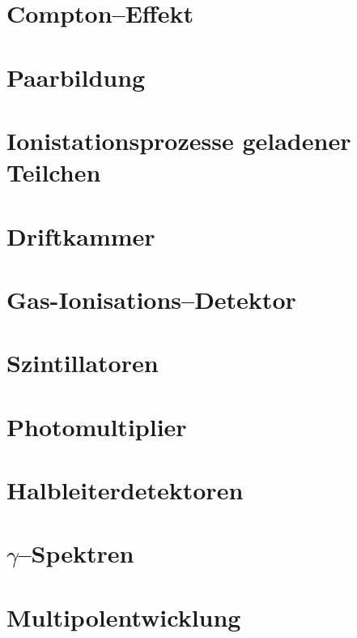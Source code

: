 \documentclass[BCOR=5mm,DIV=calc,listof=totoc,headings=big]{scrartcl}
\begin{document}
\section{Compton--Effekt}
\label{sec:compton-effekt}

\section{Paarbildung}
\label{sec:paarbildung}

\section{Ionistationsprozesse geladener Teilchen}
\label{sec:ionist-gelad-teilch}

\section{Driftkammer}
\label{sec:driftkammer}

\section{Gas-Ionisations--Detektor}
\label{sec:gas-ionis-detekt}

\section{Szintillatoren}
\label{sec:szintillatoren}

\section{Photomultiplier}
\label{sec:photomultiplier}

\section{Halbleiterdetektoren}
\label{sec:halbleiterdetektoren}

\section{$\gamma$--Spektren}
\label{sec:gamma-spektren}

\section{Multipolentwicklung}
\label{sec:multipolentwicklung}
 
\end{document}
